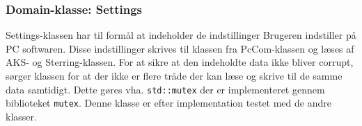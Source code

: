 \subsubsection{Domain-klasse: Settings} \label{sec:settings}
Settings-klassen har til formål at indeholder de indstillinger Brugeren indstiller på PC softwaren. Disse indstillinger skrives til klassen fra PcCom-klassen og læses af AKS- og Sterring-klassen. For at sikre at den indeholdte data ikke bliver corrupt, sørger klassen for at der ikke er flere tråde der kan læse og skrive til de samme data samtidigt. Dette gøres vha. \texttt{std::mutex} der er implementeret gennem biblioteket \texttt{mutex}. Denne klasse er efter implementation testet med de andre klasser.